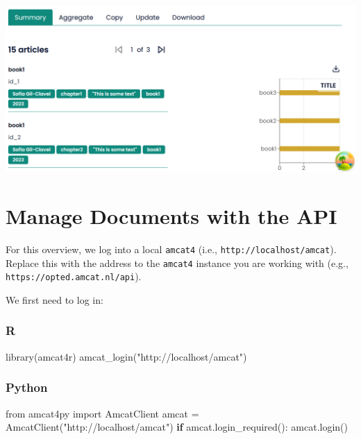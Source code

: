 \documentclass[
  letterpaper,
  DIV=11,
  numbers=noendperiod]{scrreprt}
\newenvironment{Shaded}{\begin{snugshade}}{\end{snugshade}}
\newcommand{\ControlFlowTok}[1]{\textcolor[rgb]{0.00,0.23,0.31}{\textbf{#1}}}
\newcommand{\FunctionTok}[1]{\textcolor[rgb]{0.28,0.35,0.67}{#1}}
\newcommand{\ImportTok}[1]{\textcolor[rgb]{0.00,0.46,0.62}{#1}}
\newcommand{\NormalTok}[1]{\textcolor[rgb]{0.00,0.23,0.31}{#1}}
\newcommand{\OperatorTok}[1]{\textcolor[rgb]{0.37,0.37,0.37}{#1}}
\newcommand{\StringTok}[1]{\textcolor[rgb]{0.13,0.47,0.30}{#1}}
\begin{document}
\includegraphics{media/amcat-3.2-6.png}

\section{Manage Documents with the
API}\label{manage-documents-with-the-api}

For this overview, we log into a local \texttt{amcat4} (i.e.,
\texttt{http://localhost/amcat}). Replace this with the address to the
\texttt{amcat4} instance you are working with (e.g.,
\texttt{https://opted.amcat.nl/api}).

We first need to log in:

\subsubsection{R}

\begin{Shaded}
\begin{Highlighting}[]
\FunctionTok{library}\NormalTok{(amcat4r)}
\FunctionTok{amcat\_login}\NormalTok{(}\StringTok{"http://localhost/amcat"}\NormalTok{)}
\end{Highlighting}
\end{Shaded}

\subsubsection{Python}

\begin{Shaded}
\begin{Highlighting}[]
\ImportTok{from}\NormalTok{ amcat4py }\ImportTok{import}\NormalTok{ AmcatClient}
\NormalTok{amcat }\OperatorTok{=}\NormalTok{ AmcatClient(}\StringTok{"http://localhost/amcat"}\NormalTok{)}
\ControlFlowTok{if}\NormalTok{ amcat.login\_required():}
\NormalTok{    amcat.login()}
\end{Highlighting}
\end{Shaded}
\end{document}
